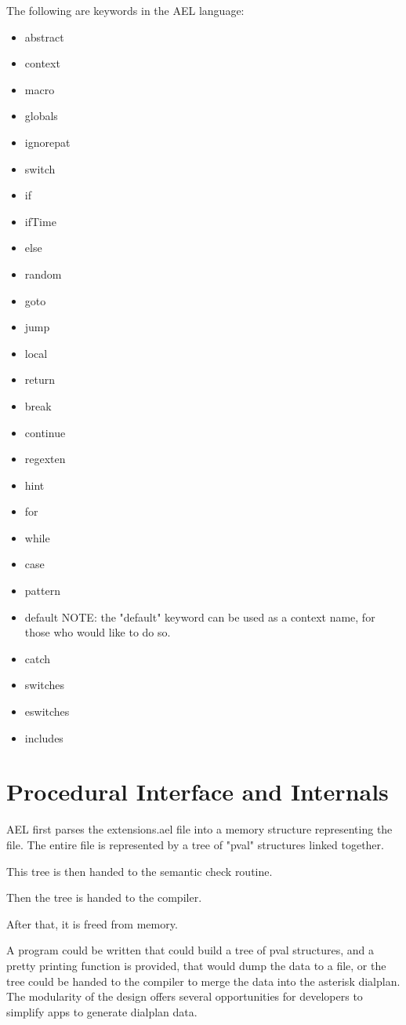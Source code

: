 {The following are keywords in the AEL language:
\begin{itemize}
    \item abstract
    \item context
    \item macro
    \item globals
    \item ignorepat
    \item switch
    \item if
    \item ifTime
    \item else
    \item random
    \item goto
    \item jump
    \item local
    \item return
    \item break
    \item continue
    \item regexten
    \item hint
    \item for
    \item while
    \item case
    \item pattern
    \item default   NOTE: the "default" keyword can be used as a context name, 
                      for those who would like to do so.
    \item catch
    \item switches
    \item eswitches
    \item includes 
\end{itemize}


\section{Procedural Interface and Internals}

AEL first parses the extensions.ael file into a memory structure representing the file.
The entire file is represented by a tree of "pval" structures linked together.

This tree is then handed to the semantic check routine. 

Then the tree is handed to the compiler. 

After that, it is freed from memory.

A program could be written that could build a tree of pval structures, and
a pretty printing function is provided, that would dump the data to a file,
or the tree could be handed to the compiler to merge the data into the 
asterisk dialplan. The modularity of the design offers several opportunities
for developers to simplify apps to generate dialplan data.


}
